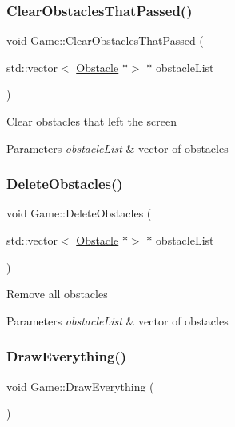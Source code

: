 \subsubsection{\texorpdfstring{Clear\+Obstacles\+That\+Passed()}{ClearObstaclesThatPassed()}}
{\footnotesize\ttfamily void Game\+::\+Clear\+Obstacles\+That\+Passed (\begin{DoxyParamCaption}\item[{std\+::vector$<$ \mbox{\hyperlink{class_obstacle}{Obstacle}} $\ast$$>$ $\ast$}]{obstacle\+List }\end{DoxyParamCaption})}

Clear obstacles that left the screen 
\begin{DoxyParams}{Parameters}
{\em obstacle\+List} & vector of obstacles \\
\hline
\end{DoxyParams}
\mbox{\label{class_game_a821eed5ca9d14267db4548842577ba80}} 
\subsubsection{\texorpdfstring{Delete\+Obstacles()}{DeleteObstacles()}}
{\footnotesize\ttfamily void Game\+::\+Delete\+Obstacles (\begin{DoxyParamCaption}\item[{std\+::vector$<$ \mbox{\hyperlink{class_obstacle}{Obstacle}} $\ast$$>$ $\ast$}]{obstacle\+List }\end{DoxyParamCaption})}

Remove all obstacles 
\begin{DoxyParams}{Parameters}
{\em obstacle\+List} & vector of obstacles \\
\hline
\end{DoxyParams}
\mbox{\label{class_game_ae4d6a13f83743a6df902449bddd6c330}} 
\subsubsection{\texorpdfstring{Draw\+Everything()}{DrawEverything()}}
{\footnotesize\ttfamily void Game\+::\+Draw\+Everything (\begin{DoxyParamCaption}{ }\end{DoxyParamCaption})}

